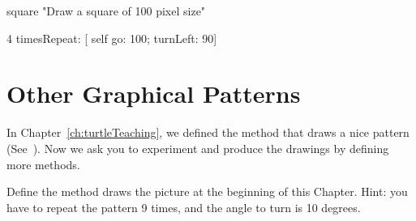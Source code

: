 \begin{method}\label{comp:square}
square 
   "Draw a square of 100 pixel size"

   4 timesRepeat: 
         [ self go: 100;
                  turnLeft: 90]
\end{method}


\section{Other Graphical Patterns}
In Chapter~\ref{ch:turtleTeaching}, we \newcommand{\replace}[2]{asked you to define}{defined} the method  that draws a nice pattern (See~). Now we ask you to \newcommand{\replace}[2]{follow the experiments}{experiment} and produce the \newcommand{\add}[1]{following} drawings by defining \newcommand{\replace}[2]{following}{more} methods. 






\begin{exonofig}
Define the method   draws the \newcommand{\replace}[2]{first picture of the}{picture at the beginning of this} Chapter. \newcommand{\replace}[2]{To help you a bit you have a repeat 9 times the pattern}{Hint: you have to repeat the pattern 9 times,} and the angle to turn is 10 degrees.

\end{exonofig}

